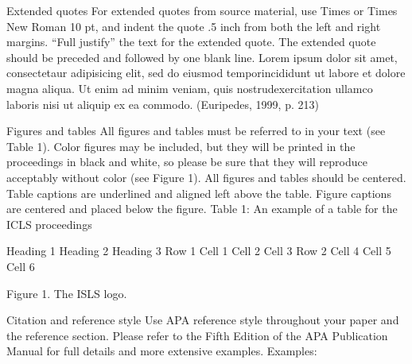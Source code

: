 \documentclass{article}
\begin{document}
Extended quotes
For extended quotes from source material, use Times or Times New Roman 10 pt, and indent the quote .5 inch
from both the left and right margins. “Full justify” the text for the extended quote. The extended quote should be
preceded and followed by one blank line.
Lorem ipsum dolor sit amet, consectetaur adipisicing elit, sed do eiusmod
temporincididunt ut labore et dolore magna aliqua. Ut enim ad minim veniam, quis
nostrudexercitation ullamco laboris nisi ut aliquip ex ea commodo. (Euripedes, 1999, p. 213)

Figures and tables
All figures and tables must be referred to in your text (see Table 1). Color figures may be included, but they will
be printed in the proceedings in black and white, so please be sure that they will reproduce acceptably without
color (see Figure 1). All figures and tables should be centered. Table captions are underlined and aligned left
above the table. Figure captions are centered and placed below the figure.
Table 1: An example of a table for the ICLS proceedings

Heading 1 Heading 2 Heading 3
Row 1 Cell 1 Cell 2 Cell 3
Row 2 Cell 4 Cell 5 Cell 6

Figure 1. The ISLS logo.

Citation and reference style
Use APA reference style throughout your paper and the reference section. Please refer to the Fifth Edition of the
APA Publication Manual for full details and more extensive examples. Examples:
\end{document}
